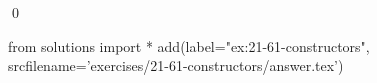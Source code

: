 
\begin{ex}
  \label{ex:21-61-constructors}
  
  \qed
\end{ex}
\begin{python0}
from solutions import *
add(label="ex:21-61-constructors",
    srcfilename='exercises/21-61-constructors/answer.tex')
\end{python0}
